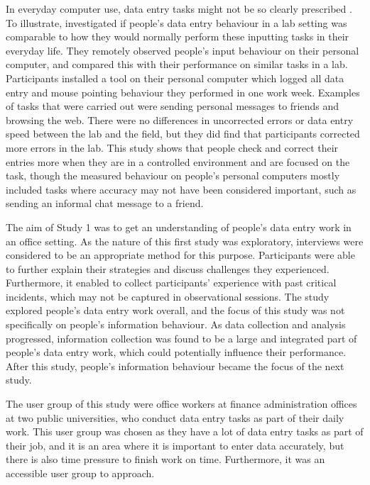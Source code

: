 In everyday computer use, data entry tasks might not be so clearly prescribed \citep{Evans2012}. To illustrate, \citet{Evans2012} investigated if people's data entry behaviour in a lab setting was comparable to how they would normally perform these inputting tasks in their everyday life. They remotely observed people's input behaviour on their personal computer, and compared this with their performance on similar tasks in a lab. Participants installed a tool on their personal computer which logged all data entry and mouse pointing behaviour they performed in one work week. Examples of tasks that were carried out were sending personal messages to friends and browsing the web. There were no differences in uncorrected errors or data entry speed between the lab and the field, but they did find that participants corrected more errors in the lab. This study shows that people check and correct their entries more when they are in a controlled environment and are focused on the task, though the measured behaviour on people's personal computers mostly included tasks where accuracy may not have been considered important, such as sending an informal chat message to a friend. 

The aim of Study 1 was to get an understanding of people's data entry work in an office setting. As the nature of this first study was exploratory, interviews were considered to be an appropriate method for this purpose. Participants were able to further explain their strategies and discuss challenges they experienced. Furthermore, it enabled to collect participants' experience with past critical incidents, which may not be captured in observational sessions. The study explored people's data entry work overall, and the focus of this study was not specifically on people's information behaviour. As data collection and analysis progressed, information collection was found to be a large and integrated part of people's data entry work, which could potentially influence their performance. After this study, people's information behaviour became the focus of the next study.

The user group of this study were office workers at finance administration offices at two public universities, who conduct data entry tasks as part of their daily work.  This user group was chosen as they have a lot of data entry tasks as part of their job, and it is an area where it is important to enter data accurately, but there is also time pressure to finish work on time. Furthermore, it was an accessible user group to approach.

